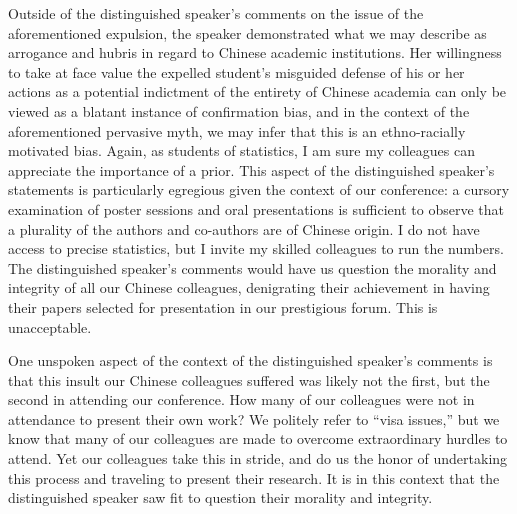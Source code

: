 \documentclass[a4paper,12pt]{article}
\begin{document}
Outside of the distinguished speaker’s comments on the issue of the aforementioned expulsion, the speaker demonstrated what we may describe as arrogance and hubris in regard to Chinese academic institutions. Her willingness to take at face value the expelled student’s misguided defense of his or her actions as a potential indictment of the entirety of Chinese academia can only be viewed as a blatant instance of confirmation bias, and in the context of the aforementioned pervasive myth, we may infer that this is an ethno-racially motivated bias. Again, as students of statistics, I am sure my colleagues can appreciate the importance of a prior. This aspect of the distinguished speaker’s statements is particularly egregious given the context of our conference: a cursory examination of poster sessions and oral presentations is sufficient to observe that a plurality of the authors and co-authors are of Chinese origin. I do not have access to precise statistics, but I invite my skilled colleagues to run the numbers. The distinguished speaker’s comments would have us question the morality and integrity of all our Chinese colleagues, denigrating their achievement in having their papers selected for presentation in our prestigious forum. This is unacceptable. 

One unspoken aspect of the context of the distinguished speaker’s comments is that this insult our Chinese colleagues suffered was likely not the first, but the second in attending our conference. How many of our colleagues were not in attendance to present their own work? We politely refer to “visa issues,” but we know that many of our colleagues are made to overcome extraordinary hurdles to attend. Yet our colleagues take this in stride, and do us the honor of undertaking this process and traveling to present their research. It is in this context that the distinguished speaker saw fit to question their morality and integrity.
\end{document}

